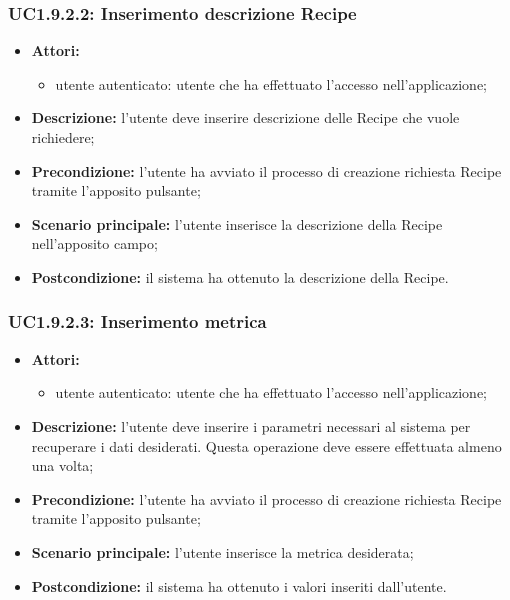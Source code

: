 \subsubsection{UC1.9.2.2: Inserimento descrizione Recipe}
\begin{itemize}
	\item \textbf{Attori:}
	\begin{itemize}
		\item utente autenticato: utente che ha effettuato l'accesso nell'applicazione;
	\end{itemize}
	\item \textbf{Descrizione:} l'utente deve inserire descrizione delle Recipe che vuole richiedere;
	\item \textbf{Precondizione:} l'utente ha avviato il processo di creazione richiesta Recipe tramite l'apposito pulsante;
	\item \textbf{Scenario principale:} l'utente inserisce la descrizione della Recipe nell'apposito campo;
	\item \textbf{Postcondizione:} il sistema ha ottenuto la descrizione della Recipe.
\end{itemize}

\subsubsection{UC1.9.2.3: Inserimento metrica}
\begin{itemize}
	\item \textbf{Attori:}
	\begin{itemize}
		\item utente autenticato: utente che ha effettuato l'accesso nell'applicazione;
	\end{itemize}
	\item \textbf{Descrizione:} l'utente deve inserire i parametri necessari al sistema per recuperare i dati desiderati. Questa operazione deve essere effettuata almeno una volta;
	\item \textbf{Precondizione:} l'utente ha avviato il processo di creazione richiesta Recipe tramite l'apposito pulsante;
	\item \textbf{Scenario principale:} l'utente inserisce la metrica desiderata;
	\item \textbf{Postcondizione:} il sistema ha ottenuto i valori inseriti dall'utente.
\end{itemize}

